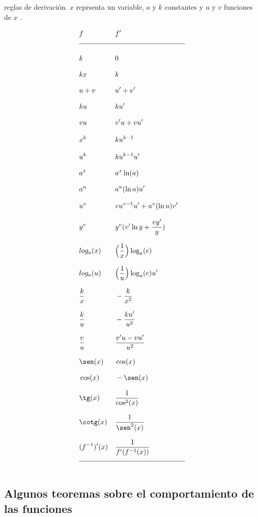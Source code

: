 \documentclass[12pt,a4paper]{extarticle}
\begin{document}
\begin{table}[!htbp]
\caption{reglas de derivaci\'on.  \( x \) reprsenta un variable, \( a \) y \( k \)
constantes y \( u \) y \( v \) funciones de \( x \) .
}
\begin{align*}
&  f &  &  f'  & \\[0.75em]
 \hline  \\
& k & & 0 & \\[0.75em]
&  kx &  &  k   & \\[0.75em]
& u+v & & u' + v' &\\[0.75em]
&  ku &  &   ku'   & \\[0.75em]
&  vu &  &  v'u + vu'   & \\[0.75em]
&  x^k & &  ku^{k-1}   & \\[0.75em]
&  u^k  & &  ku^{k-1}u'   & \\[0.75em]
&  a^x  & &  a^x\ln(a)   & \\[0.75em]
&  a^u  & &  a^u(\ln a)u'   & \\[0.75em]
&  u^v  & &  vu^{v-1}u'+u^v(\ln u)v'   & \\[0.75em]
&  y^v  & &  y^v(v'\ln y + \frac{vy'}{y})   & \\[0.75em]
&  log_a(x) & &   \Big(\frac{1}{x}\Big)\log_a(e)  & \\[0.75em]
&  log_a(u) & &   \Big(\frac{1}{u}\Big)\log_a(e)u'  & \\[0.75em]
&  \frac{k}{x} & &  -\frac{k}{x^2}  & \\[0.75em]
&  \frac{k}{u}  & &  -\frac{ku'}{u^2}   & \\[0.75em]
&  \frac{v}{u}  & &  \frac{v'u-vu'}{u^2}  & \\[0.75em]
& \sen(x) & & \cos(x) & \\[0.75em]
& \cos(x) & & -\sen(x) & \\[0.75em]
& \tg(x) & & \frac{1}{\cos^2(x)}  & \\[0.75em]
& \cotg(x) & & \frac{1}{\sen^2(x)}  & \\[0.75em]
& (f^{-1})'(x) & & \frac{1}{f'(f^{-1}(x))} &\\[0.75em]
\hline \\
\end{align*}
\label{tab:derReg}
\end{table}


\subsection{Algunos teoremas sobre el comportamiento de las funciones}
\end{document}
